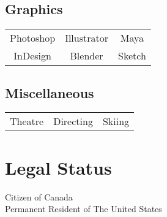 \documentclass[letterpaper]{deedy-resume} %
\begin{document}
\begin{minipage}[t]{0.33\textwidth}
  \subsection{Graphics}

  \begin{tabular}{ c c c }
    Photoshop & Illustrator & Maya \\
    InDesign & Blender & Sketch
  \end{tabular}

  \vspace{4mm}

  \subsection{Miscellaneous}

  \begin{tabular}{ c c c }
    Theatre & Directing & Skiing
  \end{tabular}

  
  \sectionspace %



  \section{Legal Status} 

  Citizen of Canada \\
  Permanent Resident of The United States

  \sectionspace %


\end{minipage} %
\hfill
%
%
\end{document}
